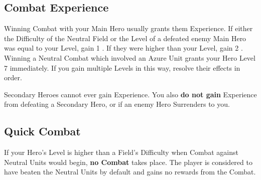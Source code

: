 \subsection*{\hypertarget{Combatexperience}{Combat Experience}}

Winning Combat with your Main Hero usually grants them Experience.
If either the Difficulty of the Neutral Field or the Level of a defeated enemy Main Hero was equal to your Level, gain 1 .
If they were higher than your Level, gain 2 .
Winning a Neutral Combat which involved an Azure  Unit grants your Hero Level 7 immediately.
If you gain multiple Levels in this way, resolve their effects in order.\par
Secondary Heroes cannot ever gain Experience.
You also \textbf{do not gain} Experience from defeating a Secondary Hero, or if an enemy Hero Surrenders to you.
\subsection*{\hypertarget{Quick}{Quick Combat}}
If your Hero’s Level is higher than a Field’s Difficulty when Combat against Neutral Units would begin, \textbf{no Combat} takes place.
The player is considered to have beaten the Neutral Units by default and gains no rewards from the Combat.

